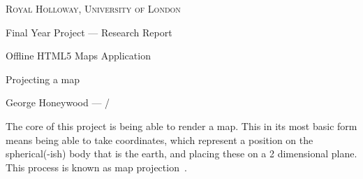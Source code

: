 \documentclass[a4paper,12pt]{article} %
\begin{document}
{
\centering
{\scshape\large Royal Holloway, University of London\par}
\vspace{0.5cm}
{\Huge Final Year Project --- Research Report\par}
\vspace{0.2cm}
{\Large Offline HTML5 Maps Application\par}
\vspace{0.2cm}
{\Huge Projecting a map\par}
\vspace{0.5cm}
{\large George Honeywood --- \the\month/\the\year\par}
\vspace{0.5cm}
}

The core of this project is being able to render a map. This in its most basic form means being able to take coordinates, which represent a position on the spherical(-ish) body that is the earth, and placing these on a 2 dimensional plane. This process is known as map projection~\cite[5]{canters2002small}.

\printbibliography{}
\end{document}
